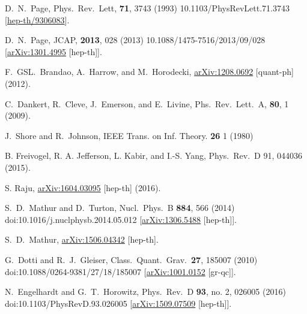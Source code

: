 \documentclass[a4paper,11pt]{article}
\theoremstyle{definition}
\begin{document}
\begin{thebibliography}{1}
  D.~N.~Page,
  Phys.\ Rev.\ Lett, {\bf 71}, 3743 (1993)
  10.1103/PhysRevLett.71.3743
  [\href{https://arxiv.org/abs/hep-th/9306083}{hep-th/9306083}].
  

  D.~N.~Page,
  JCAP, {\bf 2013}, 028 (2013)
  10.1088/1475-7516/2013/09/028
  [\href{https://arxiv.org/abs/1301.4995}{arXiv:1301.4995} [hep-th]].


  F.~GSL.~Brandao, A.~Harrow, and M.~Horodecki,
  \href{https://arxiv.org/abs/1208.0692}{arXiv:1208.0692} [quant-ph] (2012).


  C.~Dankert, R.~Cleve, J.~Emerson, and E.~Livine,
  Phs.\ Rev.\ Lett.\ A, {\bf 80}, 1 (2009).
  

	J.~Shore and R.~Johnson,
	IEEE Trans. on Inf. Theory. {\bf 26} 1 (1980)


B. Freivogel, R. A. Jefferson, L. Kabir, and I.-S. Yang,
Phys.\ Rev.\ D 91, 044036 (2015).


S. Raju, 
\href{https://arxiv.org/abs/1604.03095}{arXiv:1604.03095} [hep-th] (2016).


  S.~D.~Mathur and D.~Turton,
  Nucl.\ Phys.\ B {\bf 884}, 566 (2014)
  doi:10.1016/j.nuclphysb.2014.05.012
  [\href{https://arxiv.org/abs/1306.5488}{arXiv:1306.5488} [hep-th]].
  
  
  S.~D.~Mathur,
  \href{https://arxiv.org/abs/1506.04342}{arXiv:1506.04342} [hep-th].
  

  G.~Dotti and R.~J.~Gleiser,
  Class.\ Quant.\ Grav.\  {\bf 27}, 185007 (2010)
  doi:10.1088/0264-9381/27/18/185007
  [\href{https://arxiv.org/abs/1001.0152}{arXiv:1001.0152} [gr-qc]].


  N.~Engelhardt and G.~T.~Horowitz,
  Phys.\ Rev.\ D {\bf 93}, no. 2, 026005 (2016)
  doi:10.1103/PhysRevD.93.026005
  [\href{https://arxiv.org/abs/1509.07509}{arXiv:1509.07509} [hep-th]].
  
 


\end{thebibliography}
\end{document}
